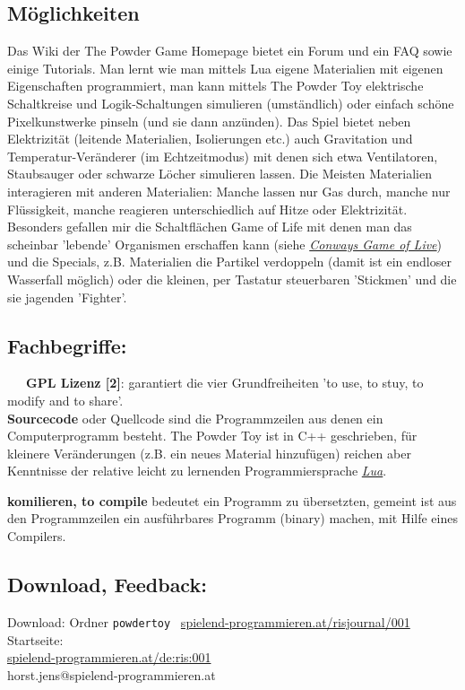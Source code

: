\documentclass[10pt,a4paper,ngerman,twoside]{article} %
\begin{document}
\subsection*{Möglichkeiten}

Das Wiki der The Powder Game Homepage bietet ein Forum und ein FAQ sowie einige Tutorials. Man lernt wie man mittels Lua eigene Materialien mit eigenen Eigenschaften programmiert, man kann mittels The Powder Toy elektrische Schaltkreise und Logik-Schaltungen simulieren (umständlich) oder einfach schöne Pixelkunstwerke pinseln (und sie dann anzünden). Das Spiel bietet neben Elektrizität (leitende Materialien, Isolierungen etc.) auch Gravitation und Temperatur-Veränderer (im Echtzeitmodus) mit denen sich etwa Ventilatoren, Staubsauger oder schwarze Löcher simulieren lassen. Die Meisten Materialien interagieren mit anderen Materialien: Manche lassen nur Gas durch, manche nur Flüssigkeit, manche reagieren unterschiedlich auf Hitze oder Elektrizität. Besonders gefallen mir die Schaltflächen Game of Life mit denen man das scheinbar 'lebende' Organismen erschaffen kann (siehe \href{https://de.wikipedia.org/wiki/Conways_Spiel_des_Lebens}{\textit{Conways Game of Live}}) und die Specials, z.B. Materialien die Partikel verdoppeln (damit ist ein endloser Wasserfall möglich) oder die kleinen, per Tastatur steuerbaren 'Stickmen' und die sie jagenden 'Fighter'. 

\subsection*{Fachbegriffe:}

~~~\textbf{GPL Lizenz [2]}: garantiert die vier Grundfreiheiten 'to use, to stuy, to modify and to share'. \\ 

\textbf{Sourcecode} oder Quellcode sind die Programmzeilen aus denen ein Computerprogramm besteht. The Powder Toy ist in C++ geschrieben, für kleinere Veränderungen (z.B. ein neues Material hinzufügen) reichen aber Kenntnisse der relative leicht zu lernenden Programmiersprache \href{https://de.wikipedia.org/wiki/Lua}{\textit{Lua}}.

\textbf{komilieren, to compile} bedeutet ein Programm zu übersetzten, gemeint ist aus den Programmzeilen ein ausführbares Programm (binary) machen, mit Hilfe eines Compilers. 

\subsection*{Download, Feedback:}
\footnotesize{
Download: Ordner \texttt{powdertoy} \Mundus\ \href{http://spielend-programmieren.at/risjournal/001}{spielend-programmieren.at/risjournal/001}\\
Startseite:\\
\href{http://spielend-programmieren.at/de:ris:001}{spielend-programmieren.at/de:ris:001}\\ 
\Letter\:  horst.jens@spielend-programmieren.at \\}
\normalsize{}
\end{document}
